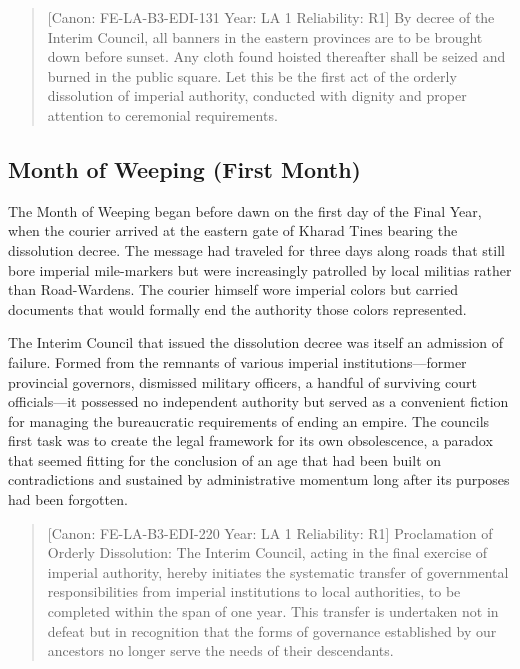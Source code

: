 \begin{quote}
{[}Canon: FE-LA-B3-EDI-131 \textbar{} Year: LA 1 \textbar{} Reliability:
R1{]} By decree of the Interim Council, all banners in the eastern
provinces are to be brought down before sunset. Any cloth found hoisted
thereafter shall be seized and burned in the public square. Let this be
the first act of the orderly dissolution of imperial authority,
conducted with dignity and proper attention to ceremonial requirements.
\end{quote}

\subsection{Month of Weeping (First
Month)}\label{month-of-weeping-first-month}

The Month of Weeping began before dawn on the first day of the Final
Year, when the courier arrived at the eastern gate of Kharad Tines
bearing the dissolution decree. The message had traveled for three days
along roads that still bore imperial mile-markers but were increasingly
patrolled by local militias rather than Road-Wardens. The courier
himself wore imperial colors but carried documents that would formally
end the authority those colors represented.

The Interim Council that issued the dissolution decree was itself an
admission of failure. Formed from the remnants of various imperial
institutions---former provincial governors, dismissed military officers,
a handful of surviving court officials---it possessed no independent
authority but served as a convenient fiction for managing the
bureaucratic requirements of ending an empire. The
council\textquotesingle s first task was to create the legal framework
for its own obsolescence, a paradox that seemed fitting for the
conclusion of an age that had been built on contradictions and sustained
by administrative momentum long after its purposes had been forgotten.

\begin{quote}
{[}Canon: FE-LA-B3-EDI-220 \textbar{} Year: LA 1 \textbar{} Reliability:
R1{]} Proclamation of Orderly Dissolution: The Interim Council, acting
in the final exercise of imperial authority, hereby initiates the
systematic transfer of governmental responsibilities from imperial
institutions to local authorities, to be completed within the span of
one year. This transfer is undertaken not in defeat but in recognition
that the forms of governance established by our ancestors no longer
serve the needs of their descendants.
\end{quote}

